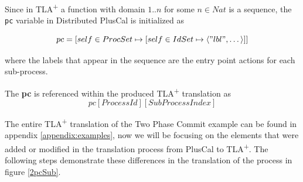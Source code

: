 \documentclass{thesul}
\newcommand{\tlaplus}{TLA\textsuperscript{+}\xspace}
\newcommand{\seq}[1]{\langle #1 \rangle}
\begin{document}
Since in \tlaplus a function with domain $1..n$ for some $n \in Nat$ is a sequence, the \verb|pc| variable in Distributed PlusCal is initialized as

\[
pc = [self \in ProcSet \mapsto [self \in IdSet \mapsto \seq{"lbl",\dots}]]
\]	

where the labels that appear in the sequence are the entry point actions for each sub-process. 

The \textbf{pc} is referenced within the produced \tlaplus translation as \[ pc[Process Id][SubProcess Index] \]
		  
The entire \tlaplus translation of the Two Phase Commit example can be found in appendix \ref{appendix:examples}, now we will be focusing on the elements that were added or modified in the translation process from PlusCal to \tlaplus. The following steps demonstrate these differences in the translation of the process in figure \ref{2pcSub}.
\end{document}
